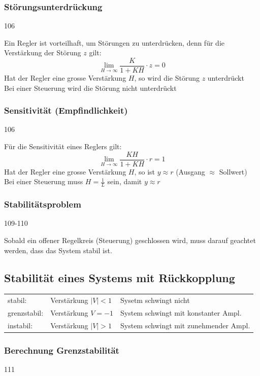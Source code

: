 \subsubsection{Störungsunterdrückung}{106}

    Ein Regler ist vorteilhaft, um Störungen zu unterdrücken, denn für die Verstärkung der Störung $z$ gilt:
    $$ \lim\limits_{H \to \infty} \frac{K}{1 + K H} \cdot z = 0 $$
    \textrightarrow Hat der Regler eine grosse Verstärkung $H$, so wird die Störung $z$ unterdrückt\\
    \textrightarrow Bei einer Steuerung wird die Störung nicht unterdrückt


\subsubsection{Sensitivität (Empfindlichkeit)}{106}

    Für die Sensitivität eines Reglers gilt:
    $$ \lim\limits_{H \to \infty} \frac{K H}{1 + K H} \cdot r = 1 $$
    \textrightarrow Hat der Regler eine grosse Verstärkung $H$, so ist $y \approx r$ (Ausgang $\approx$ Sollwert)\\
    \textrightarrow Bei einer Steuerung muss $H = \frac{1}{L}$ sein, damit $y \approx r$


\subsubsection{Stabilitätsproblem}{109-110}

    Sobald ein offener Regelkreis (Steuerung) geschlossen wird, muss darauf geachtet werden, dass das System stabil ist.
    

\subsection{Stabilität eines Systems mit Rückkopplung}

    \begin{tabular}{lll}
        stabil:         & Verstärkung $|V| < 1$ & Sysetm schwingt nicht \\
        grenzstabil:    & Verstärkung $V = -1$  & System schwingt mit konstanter Ampl.\\
        instabil:       & Verstärkung $|V| > 1$ & System schwingt mit zunehmender Ampl.\\
    \end{tabular}


\subsubsection{Berechnung Grenzstabilität}{111}

